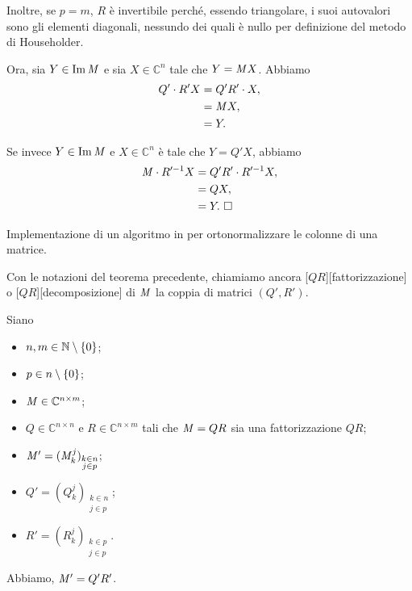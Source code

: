 \par Inoltre, se $p = m$,
$R$ \`e invertibile perch\'e, essendo triangolare, i suoi
autovalori sono gli elementi diagonali, nessundo dei quali \`e nullo
per definizione del metodo di Householder.
\par Ora, sia $Y \in \operatorname{Im}{\mathit{M}}$ e sia $X \in \mathbb{C}^n$ tale che
$Y = \mathit{M} X$. Abbiamo
\begin{align*}
  Q' \cdot R'X
  &= Q'R' \cdot X,\\
  &= \mathit{M} X,\\
  &= Y.
\end{align*}
\par Se invece $Y \in \operatorname{Im}{\mathit{M}}$ e $X \in \mathbb{C}^n$ \`e tale che
$Y = Q'X$, abbiamo
\begin{align*}
  \mathit{M} \cdot R'^{-1}X
  &= Q'R' \cdot R'^{-1}X,\\
  &= QX,\\
  &= Y.\text{ $\square$}
\end{align*}
\begin{listing}
	\caption{Implementazione di un algoritmo in  per ortonormalizzare
  le colonne di una matrice.}
\end{listing}
\begin{Definition}
  Con le notazioni del teorema precedente,
  chiamiamo ancora
  [$QR$][fattorizzazione]
  o
  [$QR$][decomposizione]
  di $\mathit{M}$ la coppia di matrici $(Q',R')$.
\end{Definition}
\begin{Theorem}
  \label{th_FattorizzazioneQRparziale}
  Siano
  \begin{itemize}
    \item $n, m \in \mathbb{N} \setminus \lbrace 0 \rbrace$;
    \item $p \in n \setminus \lbrace 0 \rbrace$;
    \item $\mathit{M} \in \mathbb{C}^{n \times m}$;
    \item $Q \in \mathbb{C}^{n \times n}$ e $R \in \mathbb{C}^{n \times m}$
      tali che $\mathit{M} = QR$ sia una fattorizzazione $QR$;
    \item $\mathit{M}' = (\mathit{M}_k^j)_{\substack{k \in n\\j \in p}}$;
    \item $Q' = (Q_k^j)_{\substack{k \in n\\j \in p}}$;
    \item $R' = (R_k^j)_{\substack{k \in p\\j \in p}}$.
  \end{itemize}
  Abbiamo, $\mathit{M}' = Q'R'$.
\end{Theorem}
